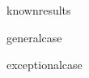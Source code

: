 \documentclass[12 pt,oneside]{book}
\begin{document}
{knownresults}

{generalcase}

{exceptionalcase}
\end{document}
